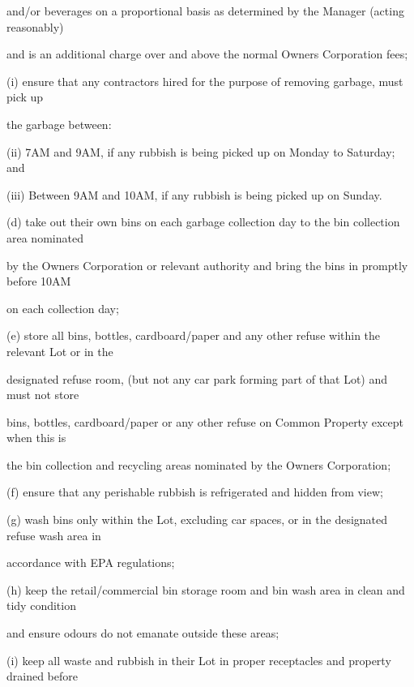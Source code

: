 \documentclass{article}
\begin{document}
{\fontsize{10.02}{1}and/or beverages on a proportional basis as determined by the Manager (acting reasonably) }

{\fontsize{10.02}{1}and is an additional charge over and above the normal Owners Corporation fees; }

{\fontsize{9.962}{1}(i) ensure that any contractors hired for the purpose of removing garbage, must pick up }

{\fontsize{10.02}{1}the garbage between: }

{\fontsize{9.962}{1}(ii) 7AM and 9AM, if any rubbish is being picked up on Monday to Saturday; and }


{\fontsize{9.962}{1}(iii) Between 9AM and 10AM, if any rubbish is being picked up on Sunday. }

{\fontsize{9.962}{1}(d) take out their own bins on each garbage collection day to the bin collection area nominated }

{\fontsize{10.02}{1}by the Owners Corporation or relevant authority and bring the bins in promptly before 10AM }

{\fontsize{10.02}{1}on each collection day; }

{\fontsize{9.962}{1}(e) store all bins, bottles, cardboard/paper and any other refuse within the relevant Lot or in the }

{\fontsize{10.02}{1}designated refuse room, (but not any car park forming part of that Lot) and must not store }

{\fontsize{10.02}{1}bins, bottles, cardboard/paper or any other refuse on Common Property except when this is }

{\fontsize{10.02}{1}the bin collection and recycling areas nominated by the Owners Corporation; }

{\fontsize{9.962}{1}(f) ensure that any perishable rubbish is refrigerated and hidden from view; }

{\fontsize{9.962}{1}(g) wash bins only within the Lot, excluding car spaces, or in the designated refuse wash area in }

{\fontsize{10.02}{1}accordance with EPA regulations; }

{\fontsize{9.962}{1}(h) keep the retail/commercial bin storage room and bin wash area in clean and tidy condition }

{\fontsize{10.02}{1}and ensure odours do not emanate outside these areas; }

{\fontsize{9.962}{1}(i) keep all waste and rubbish in their Lot in proper receptacles and property drained before }
\end{document}

